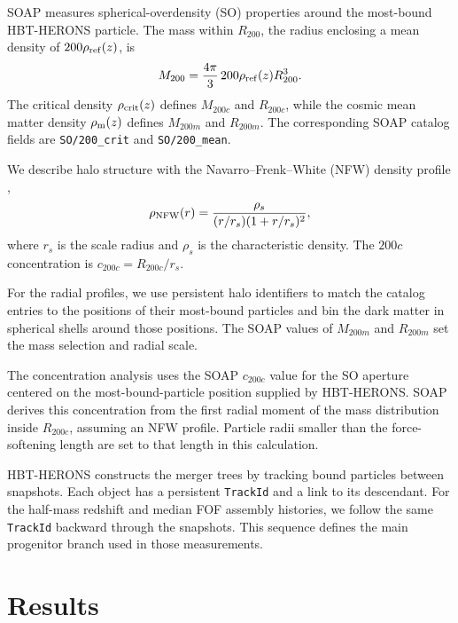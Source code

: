 \documentclass[
 reprint,
 superscriptaddress,
 nofootinbib,
 nobibnotes,
 amsmath,
 amssymb,
 aps,
 prd,
 floatfix,
 longbibliography
]{revtex4-2}
\DeclareRobustCommand{\change}[1]{#1}
\newcommand\Tk[1]{{\color{red} \bf #1}}
\begin{document}
\change{\textsc{SOAP} \citep{McGibbon2025SOAP} measures spherical-overdensity (SO) properties around the most-bound \textsc{HBT-HERONS} particle. The mass within \(R_{200}\), the radius enclosing a mean density of \(200\rho_{\rm ref}(z)\), is}
\begin{equation}
M_{200}=\frac{4\pi}{3}\,200\rho_{\rm ref}(z)R_{200}^3.
\end{equation}
\change{The critical density \(\rho_{\rm crit}(z)\) defines \(M_{200c}\) and \(R_{200c}\), while the cosmic mean matter density \(\rho_{\rm m}(z)\) defines \(M_{200m}\) and \(R_{200m}\). The corresponding \textsc{SOAP} catalog fields are \texttt{SO/200\_crit} and \texttt{SO/200\_mean}.}

We describe halo structure with the Navarro--Frenk--White (NFW) density profile \citep{Navarro1996NFW,Navarro1997NFW},
\begin{equation}
\label{eq:nfw_profile}
\rho_{\rm NFW}(r)=
\frac{\rho_s}{(r/r_s)(1+r/r_s)^2},
\end{equation}
where \(r_s\) is the scale radius and \(\rho_s\) is the characteristic density. The \(200c\) concentration is \(c_{200c}=R_{200c}/r_s\).

\change{For the radial profiles, we use persistent halo identifiers to match the catalog entries to the positions of their most-bound particles and bin the dark matter in spherical shells around those positions. The \textsc{SOAP} values of \(M_{200m}\) and \(R_{200m}\) set the mass selection and radial scale.}

The concentration analysis uses the \textsc{SOAP} \(c_{200c}\) value for the SO aperture centered on the most-bound-particle position supplied by \textsc{HBT-HERONS}. \textsc{SOAP} derives this concentration from the first radial moment of the mass distribution inside \(R_{200c}\), assuming an NFW profile. Particle radii smaller than the force-softening length are set to that length in this calculation.


\textsc{HBT-HERONS} constructs the merger trees by tracking bound particles between snapshots. Each object has a persistent \texttt{TrackId} and a link to its descendant. For the half-mass redshift and median FOF assembly histories, we follow the same \texttt{TrackId} backward through the snapshots. This sequence defines the main progenitor branch used in those measurements.


\section{Results}
\label{sec:results}
\end{document}

